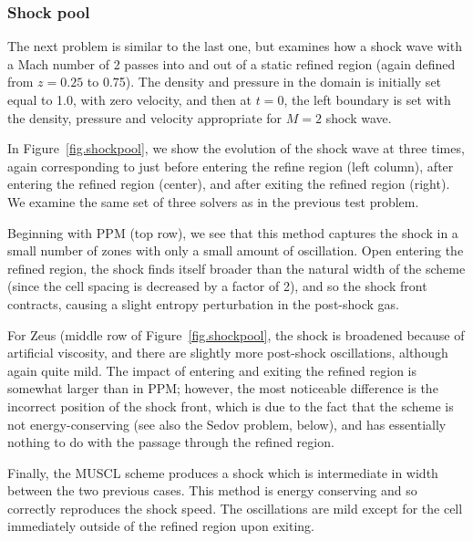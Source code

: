 \subsubsection{Shock pool}
\label{sec.tests.shockpool}

The next problem is similar to the last one, but examines how a shock wave with a Mach number of 2 passes into and out of a static refined region (again defined from $z=0.25$ to 0.75).  The density and pressure in the domain is initially set equal to 1.0, with zero velocity, and then at $t=0$, the left boundary is set with the density, pressure and velocity appropriate for $M=2$ shock wave.

In Figure~\ref{fig.shockpool}, we show the evolution of the shock wave at three times, again corresponding to just before entering the refine region (left column), after entering the refined region (center), and after exiting the refined region (right).  We examine the same set of three solvers as in the previous test problem.

Beginning with PPM (top row), we see that this method captures the shock in a small number of zones with only a small amount of oscillation.  Open entering the refined region, the shock finds itself broader than the natural width of the scheme (since the cell spacing is decreased by a factor of 2), and so the shock front contracts, causing a slight entropy perturbation in the post-shock gas. 

For Zeus (middle row of Figure~\ref{fig.shockpool}, the shock is broadened because of artificial viscosity, and there are slightly more post-shock oscillations, although again quite mild.  The impact of entering and exiting the refined region is somewhat larger than in PPM; however, the most noticeable difference is the incorrect position of the shock front, which is due to the fact that the scheme is not energy-conserving (see also the Sedov problem, below), and has essentially nothing to do with the passage through the refined region.

Finally, the MUSCL scheme produces a shock which is intermediate in width between the two previous cases.  This method is energy conserving and so correctly reproduces the shock speed.  The oscillations are mild except for the cell immediately outside of the refined region upon exiting.

